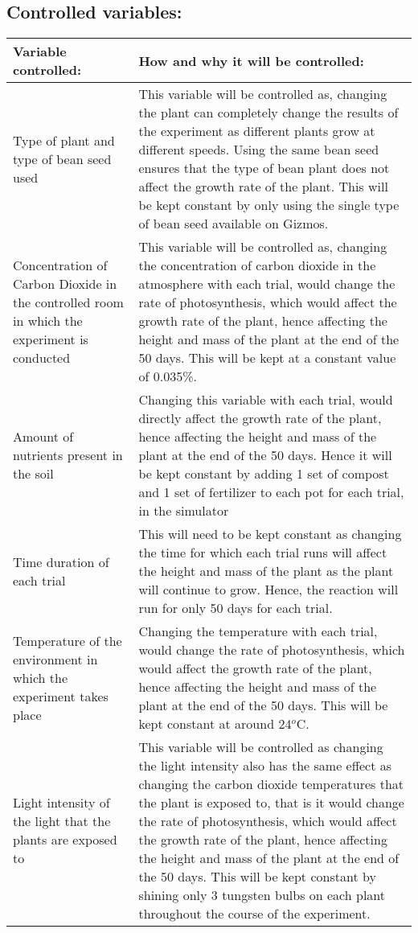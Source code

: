 \documentclass[11pt, a4]{article}
\begin{document}
		\subsection{Controlled variables:}
			\begin{longtable}{|>{\centering\arraybackslash}m{4.5cm}|>{\centering\arraybackslash}m{10.5cm}|}
				\hline
				\textbf{Variable controlled:} & \textbf{How and why it will be controlled:}\\
				\hline
				\hline
				Type of plant and type of bean seed used & This variable will be controlled as, changing the plant can completely change the results of the experiment as different plants grow at different speeds. Using the same bean seed ensures that the type of bean plant does not affect the growth rate of the plant. This will be kept constant by only using the single type of bean seed available on Gizmos.\\
				\hline
				Concentration of Carbon Dioxide in the controlled room in which the experiment is conducted & This variable will be controlled as, changing the concentration of carbon dioxide in the atmosphere with each trial, would change the rate of photosynthesis, which would affect the growth rate of the plant, hence affecting the height and mass of the plant at the end of the 50 days. This will be kept at a constant value of 0.035\%.\\
				\hline
				Amount of nutrients present in the soil & Changing this variable with each trial, would directly affect the growth rate of the plant, hence affecting the height and mass of the plant at the end of the 50 days. Hence it will be kept constant by adding 1 set of compost and 1 set of fertilizer to each pot for each trial, in the simulator\\
				\hline
				Time duration of each trial & This will need to be kept constant as changing the time for which each trial runs will affect the height and mass of the plant as the plant will continue to grow. Hence, the reaction will run for only 50 days for each trial.\\
				\hline
				Temperature of the environment in which the experiment takes place & Changing the temperature with each trial, would change the rate of photosynthesis, which would affect the growth rate of the plant, hence affecting the height and mass of the plant at the end of the 50 days. This will be kept constant at around 24$^{o}$C.\\
				\hline
				Light intensity of the light that the plants are exposed to & This variable will be controlled as changing the light intensity also has the same effect as changing the carbon dioxide temperatures that the plant is exposed to, that is it would change the rate of photosynthesis, which would affect the growth rate of the plant, hence affecting the height and mass of the plant at the end of the 50 days. This will be kept constant by shining only 3 tungsten bulbs on each plant throughout the course of the experiment.\\

\end{longtable}
\end{document}
